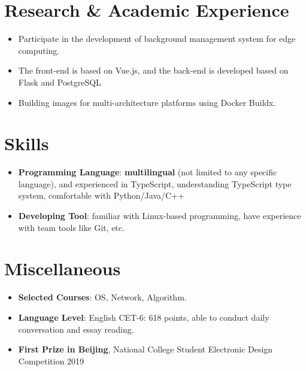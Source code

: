 \documentclass{resume}
\newcommand{\en}[1]{#1}
\newcommand{\zh}[1]{}
\begin{document}
\section{\en{Research \& Academic Experience}\zh{研究经历}}
\en{}
\zh{\datedsubsection{\textbf{中国科学院自动化研究所}}{2019/04 -- 2020/06}}
\en{}
\zh{\role{复杂系统管理与控制国家重点实验室}{科研实习}}
\begin{itemize}
  \item \en{Participate in the development of background management system for edge computing.}
        \zh{参与构建面向边缘计算的后台管理系统开发}
  \item \en{The front-end is based on Vue.js, and the back-end is developed based on Flask and PostgreSQL}
        \zh{前端基于 Vue.js 进行开发，后端基于 Flask 和 PostgreSQL 进行开发}
  \item \en{Building images for multi-architecture platforms using Docker Buildx.}
        \zh{使用 Docker Buildx 构建多系统架构支持的 Docker 镜像并部署}
\end{itemize}

\section{\en{Skills}\zh{技能}}
\begin{itemize}[parsep=0.25ex]
  \item \en{\textbf{Programming Language}: \textbf{multilingual} (not limited to any specific language), and experienced in TypeScript, understanding TypeScript type system, comfortable with Python/Java/C++}
        \zh{\textbf{编程语言}: \textbf{泛语言}（编程不受特定语言限制），熟悉 TypeScript 编程，了解 Typescript 类型系统，了解 Python/Java/C++ 等}
  \item \en{\textbf{Developing Tool}: familiar with Linux-based programming, have experience with team tools like Git, etc.}
        \zh{\textbf{开发工具}: 熟悉 Linux，有 Git 等团队协作工具的使用经验}
\end{itemize}

\section{\en{Miscellaneous}\zh{杂项}}
\begin{itemize}[parsep=0.25ex]
  \item \en{\textbf{Selected Courses}: OS, Network, Algorithm.}
        \zh{\textbf{主修课程}: 操作系统、计算机网络、算法设计与分析}
  \item \en{\textbf{Language Level}: English CET-6: 618 points, able to conduct daily conversation and essay reading.}
        \zh{\textbf{语言水平}: 英语 CET-6: 618 分，能够进行日常对话和论文阅读}
  \item \en{\textbf{First Prize in Beijing}, National College Student Electronic Design Competition 2019}
        \zh{\textbf{北京市一等奖}, 2019 年全国大学生电子设计竞赛}
\end{itemize}
\end{document}
